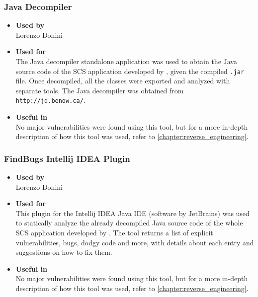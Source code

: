 \subsubsection*{Java Decompiler}
\begin{itemize}
	\item \textbf{Used by}\\ Lorenzo Donini
	\item \textbf{Used for}\\ The Java decompiler standalone application was used to obtain the Java source code of the SCS application developed by \bs, given the compiled \texttt{.jar} file. Once decompiled, all the classes were exported and analyzed with separate tools. The Java decompiler was obtained from \texttt{http://jd.benow.ca/}.
	\item \textbf{Useful in}\\ No major vulnerabilities were found using this tool, but for a more in-depth description of how this tool was used, refer to \ref{chapter:reverse_engineering}.
\end{itemize}

\subsubsection*{FindBugs Intellij IDEA Plugin}
\begin{itemize}
	\item \textbf{Used by}\\ Lorenzo Donini
	\item \textbf{Used for}\\ This plugin for the Intellij IDEA Java IDE (software by JetBrains) was used to statically analyze the already decompiled Java source code of the whole SCS application developed by \bs. The tool returns a list of explicit vulnerabilities, bugs, dodgy code and more, with details about each entry and suggestions on how to fix them.
	\item \textbf{Useful in}\\ No major vulnerabilities were found using this tool, but for a more in-depth  description of how this tool was used, refer to \ref{chapter:reverse_engineering}.
\end{itemize}

